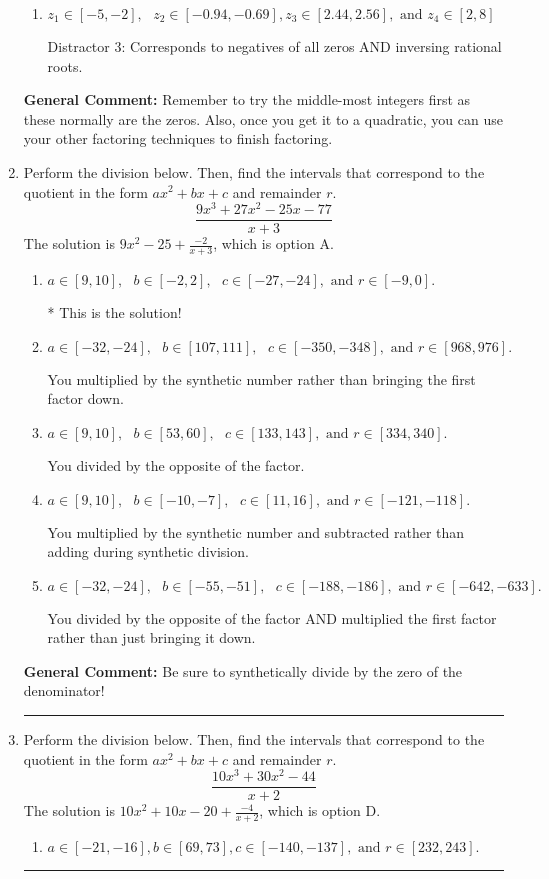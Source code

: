 \documentclass{extbook}[14pt]
\newcommand{\litem}[1]{\item #1

\rule{\textwidth}{0.4pt}}
\begin{document}
\begin{enumerate}
{\begin{enumerate}[label=\Alph*.]
 Distractor 1: Corresponds to negatives of all zeros.
\item \( z_1 \in [-5, -2], \text{   }  z_2 \in [-0.94, -0.69], z_3 \in [2.44, 2.56], \text{   and   } z_4 \in [2, 8] \)

 Distractor 3: Corresponds to negatives of all zeros AND inversing rational roots.
\end{enumerate}

\textbf{General Comment:} Remember to try the middle-most integers first as these normally are the zeros. Also, once you get it to a quadratic, you can use your other factoring techniques to finish factoring.
}
\litem{
Perform the division below. Then, find the intervals that correspond to the quotient in the form $ax^2+bx+c$ and remainder $r$.
\[ \frac{9x^{3} +27 x^{2} -25 x -77}{x + 3} \]The solution is \( 9x^{2} -25 + \frac{-2}{x + 3} \), which is option A.\begin{enumerate}[label=\Alph*.]
\item \( a \in [9, 10], \text{   } b \in [-2, 2], \text{   } c \in [-27, -24], \text{   and   } r \in [-9, 0]. \)

* This is the solution!
\item \( a \in [-32, -24], \text{   } b \in [107, 111], \text{   } c \in [-350, -348], \text{   and   } r \in [968, 976]. \)

 You multiplied by the synthetic number rather than bringing the first factor down.
\item \( a \in [9, 10], \text{   } b \in [53, 60], \text{   } c \in [133, 143], \text{   and   } r \in [334, 340]. \)

 You divided by the opposite of the factor.
\item \( a \in [9, 10], \text{   } b \in [-10, -7], \text{   } c \in [11, 16], \text{   and   } r \in [-121, -118]. \)

 You multiplied by the synthetic number and subtracted rather than adding during synthetic division.
\item \( a \in [-32, -24], \text{   } b \in [-55, -51], \text{   } c \in [-188, -186], \text{   and   } r \in [-642, -633]. \)

 You divided by the opposite of the factor AND multiplied the first factor rather than just bringing it down.
\end{enumerate}

\textbf{General Comment:} Be sure to synthetically divide by the zero of the denominator!
}
\litem{
Perform the division below. Then, find the intervals that correspond to the quotient in the form $ax^2+bx+c$ and remainder $r$.
\[ \frac{10x^{3} +30 x^{2} -44}{x + 2} \]The solution is \( 10x^{2} +10 x -20 + \frac{-4}{x + 2} \), which is option D.\begin{enumerate}[label=\Alph*.]
\item \( a \in [-21, -16], b \in [69, 73], c \in [-140, -137], \text{ and } r \in [232, 243]. \)


\end{enumerate}}
\end{enumerate}
\end{document}

